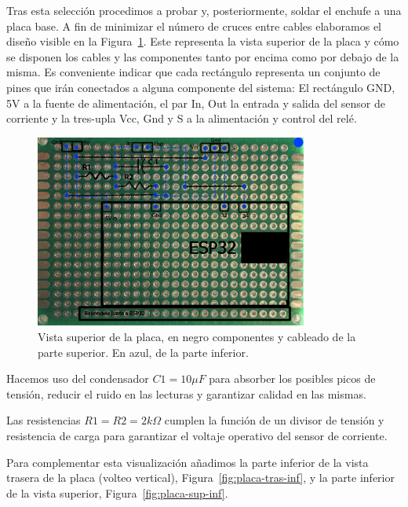 \documentclass[a4paper,10pt]{article}
\begin{document}
Tras esta selección procedimos a probar y, posteriormente, soldar el
enchufe a una placa base. A fin de minimizar el número de cruces entre
cables elaboramos el diseño visible en
la Figura~\ref{fig:placa-sup-arriba-abajo}. Este representa la vista superior de
la placa y cómo se disponen los cables y las componentes tanto por
encima como por debajo de la misma. Es conveniente indicar que cada
rectángulo representa un conjunto de pines que irán conectados a
alguna componente del sistema: El rectángulo GND, 5V a la fuente de
alimentación, el par In, Out la entrada y salida del sensor de
corriente y la tres-upla Vcc, Gnd y S a la alimentación y control del
relé.

\begin{figure}
  \centering
  \includegraphics[width=0.8\textwidth]{img/dibujo_placa_vista_superior_arriba_y_abajo.png}
  \caption{Vista superior de la placa, en negro componentes y cableado
  de la parte superior. En azul, de la parte inferior.}\label{fig:placa-sup-arriba-abajo}
\end{figure}

Hacemos uso del condensador $C1 = 10\mu F$ para absorber los
posibles picos de tensión, reducir el ruido en las lecturas y
garantizar calidad en las mismas.

Las resistencias $R1=R2=2k\Omega$ cumplen la función de un divisor de
tensión y resistencia de carga para garantizar el voltaje operativo
del sensor de corriente.

Para complementar esta visualización añadimos la parte inferior de la
vista trasera de la placa (volteo vertical), Figura~\ref{fig:placa-tras-inf},
y la parte inferior de la vista superior, Figura~\ref{fig:placa-sup-inf}.
\end{document}

